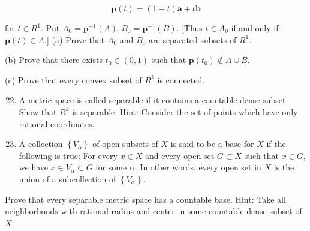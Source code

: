 \documentclass[10pt]{article}
\begin{document}
$$
\mathbf{p}(t)=(1-t) \mathbf{a}+t \mathbf{b}
$$

for $t \in R^{1}$. Put $A_{0}=\mathbf{p}^{-1}(A), B_{0}=\mathbf{p}^{-1}(B)$. [Thus $t \in A_{0}$ if and only if $\mathbf{p}(t) \in A$.] (a) Prove that $A_{0}$ and $B_{0}$ are separated subsets of $R^{1}$.

(b) Prove that there exists $t_{0} \in(0,1)$ such that $\mathbf{p}\left(t_{0}\right) \notin A \cup B$.

(c) Prove that every convex subset of $R^{k}$ is connected.

\begin{enumerate}
  \setcounter{enumi}{21}
  \item A metric space is called separable if it contains a countable dense subset. Show that $R^{k}$ is separable. Hint: Consider the set of points which have only rational coordinates.

  \item A collection $\left\{V_{\alpha}\right\}$ of open subsets of $X$ is said to be a base for $X$ if the following is true: For every $x \in X$ and every open set $G \subset X$ such that $x \in G$, we have $x \in V_{\alpha} \subset G$ for some $\alpha$. In other words, every open set in $X$ is the union of a subcollection of $\left\{V_{\alpha}\right\}$.

\end{enumerate}

Prove that every separable metric space has a countable base. Hint: Take all neighborhoods with rational radius and center in some countable dense subset of $X$.
\end{document}
